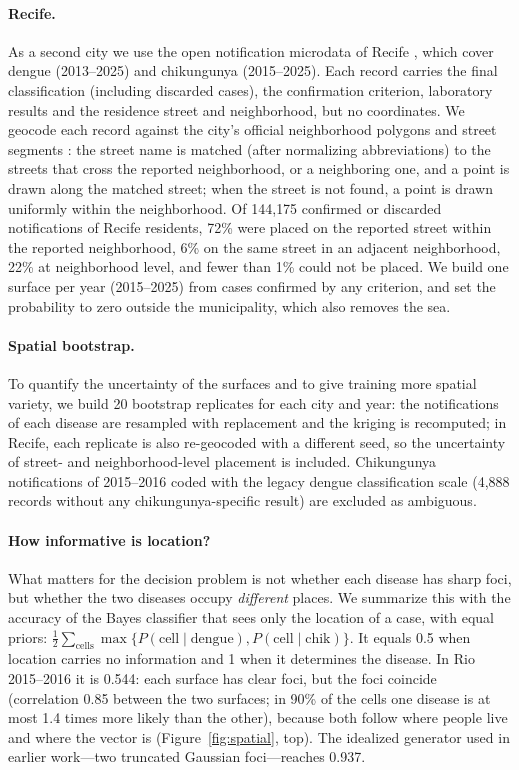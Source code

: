\documentclass[11pt,a4paper]{article}
\begin{document}
\paragraph{Recife.} As a second city we use the open notification microdata of Recife \cite{recife_dados}, which cover dengue (2013--2025) and chikungunya (2015--2025). Each record carries the final classification (including discarded cases), the confirmation criterion, laboratory results and the residence street and neighborhood, but no coordinates. We geocode each record against the city's official neighborhood polygons and street segments \cite{recife_area_urbana}: the street name is matched (after normalizing abbreviations) to the streets that cross the reported neighborhood, or a neighboring one, and a point is drawn along the matched street; when the street is not found, a point is drawn uniformly within the neighborhood. Of 144{,}175 confirmed or discarded notifications of Recife residents, 72\% were placed on the reported street within the reported neighborhood, 6\% on the same street in an adjacent neighborhood, 22\% at neighborhood level, and fewer than 1\% could not be placed. We build one surface per year (2015--2025) from cases confirmed by any criterion, and set the probability to zero outside the municipality, which also removes the sea.

\paragraph{Spatial bootstrap.} To quantify the uncertainty of the surfaces and to give training more spatial variety, we build 20 bootstrap replicates for each city and year: the notifications of each disease are resampled with replacement and the kriging is recomputed; in Recife, each replicate is also re-geocoded with a different seed, so the uncertainty of street- and neighborhood-level placement is included. Chikungunya notifications of 2015--2016 coded with the legacy dengue classification scale (4{,}888 records without any chikungunya-specific result) are excluded as ambiguous.

\paragraph{How informative is location?} What matters for the decision problem is not whether each disease has sharp foci, but whether the two diseases occupy \emph{different} places. We summarize this with the accuracy of the Bayes classifier that sees only the location of a case, with equal priors: $\tfrac12 \sum_{\text{cells}} \max\{P(\text{cell}\mid\text{dengue}), P(\text{cell}\mid\text{chik})\}$. It equals 0.5 when location carries no information and 1 when it determines the disease. In Rio 2015--2016 it is 0.544: each surface has clear foci, but the foci coincide (correlation 0.85 between the two surfaces; in 90\% of the cells one disease is at most 1.4 times more likely than the other), because both follow where people live and where the vector is (Figure~\ref{fig:spatial}, top). The idealized generator used in earlier work---two truncated Gaussian foci---reaches 0.937.
\end{document}
